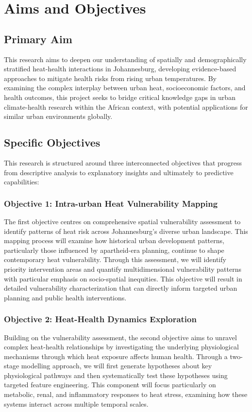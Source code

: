 \section{Aims and Objectives}
\graphicspath{{./images/}}

\subsection{Primary Aim}
This research aims to deepen our understanding of spatially and demographically stratified heat-health interactions in Johannesburg, developing evidence-based approaches to mitigate health risks from rising urban temperatures. By examining the complex interplay between urban heat, socioeconomic factors, and health outcomes, this project seeks to bridge critical knowledge gaps in urban climate-health research within the African context, with potential applications for similar urban environments globally.

\subsection{Specific Objectives}
This research is structured around three interconnected objectives that progress from descriptive analysis to explanatory insights and ultimately to predictive capabilities:

\subsubsection{Objective 1: Intra-urban Heat Vulnerability Mapping}
The first objective centres on comprehensive spatial vulnerability assessment to identify patterns of heat risk across Johannesburg's diverse urban landscape. This mapping process will examine how historical urban development patterns, particularly those influenced by apartheid-era planning, continue to shape contemporary heat vulnerability. Through this assessment, we will identify priority intervention areas and quantify multidimensional vulnerability patterns with particular emphasis on socio-spatial inequities. This objective will result in detailed vulnerability characterization that can directly inform targeted urban planning and public health interventions.

\subsubsection{Objective 2: Heat-Health Dynamics Exploration}
Building on the vulnerability assessment, the second objective aims to unravel complex heat-health relationships by investigating the underlying physiological mechanisms through which heat exposure affects human health. Through a two-stage modelling approach, we will first generate hypotheses about key physiological pathways and then systematically test these hypotheses using targeted feature engineering. This component will focus particularly on metabolic, renal, and inflammatory responses to heat stress, examining how these systems interact across multiple temporal scales. 


